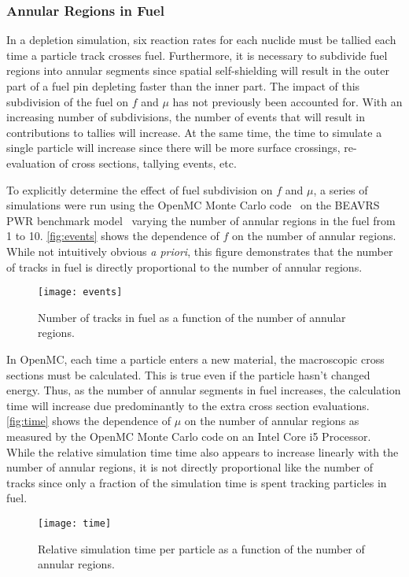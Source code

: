 \documentclass{snamc2013}
\begin{document}
\subsubsection{Annular Regions in Fuel}

In a depletion simulation, six reaction rates for each nuclide must be tallied
each time a particle track crosses fuel. Furthermore, it is necessary to
subdivide fuel regions into annular segments since spatial self-shielding will
result in the outer part of a fuel pin depleting faster than the inner part. The
impact of this subdivision of the fuel on $f$ and $\mu$ has not previously been
accounted for. With an increasing number of subdivisions, the number of events
that will result in contributions to tallies will increase. At the same time,
the time to simulate a single particle will increase since there will be more
surface crossings, re-evaluation of cross sections, tallying events, etc.

To explicitly determine the effect of fuel subdivision on $f$ and $\mu$, a
series of simulations were run using the OpenMC Monte Carlo
code~\cite{ane-romano-2013} on the BEAVRS PWR benchmark
model~\cite{mc-horelik-2013} varying the number of annular regions in the fuel
from 1 to 10.  \autoref{fig:events} shows the dependence of $f$ on the number of
annular regions. While not intuitively obvious \emph{a priori}, this figure
demonstrates that the number of tracks in fuel is directly proportional to the
number of annular regions.
\begin{figure}[htb]
  \centering
  \texttt{[image: events]}
  \caption{Number of tracks in fuel as a function of the number of annular
    regions.}
  \label{fig:events}
\end{figure}

In OpenMC, each time a particle enters a new material, the macroscopic cross
sections must be calculated. This is true even if the particle hasn't changed
energy. Thus, as the number of annular segments in fuel increases, the
calculation time will increase due predominantly to the extra cross section
evaluations. \autoref{fig:time} shows the dependence of $\mu$ on the number of
annular regions as measured by the OpenMC Monte Carlo code on an Intel Core i5
Processor. While the relative simulation time time also appears to increase
linearly with the number of annular regions, it is not directly proportional
like the number of tracks since only a fraction of the simulation time is spent
tracking particles in fuel.
\begin{figure}[b]
  \centering
  \texttt{[image: time]}
  \caption{Relative simulation time per particle as a function of the number of
    annular regions.}
  \label{fig:time}
\end{figure}
\end{document}
